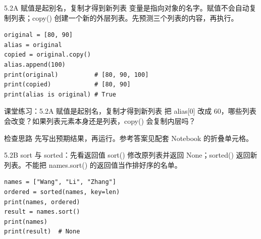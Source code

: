 \begin{frame}[fragile]{5.2A 赋值是起别名，复制才得到新列表}
\small 变量是指向对象的名字。赋值不会自动复制列表；copy() 创建一个新的外层列表。先预测三个列表的内容，再执行。
\medskip
\begin{lstlisting}
original = [80, 90]
alias = original
copied = original.copy()
alias.append(100)
print(original)          # [80, 90, 100]
print(copied)            # [80, 90]
print(alias is original) # True
\end{lstlisting}
\end{frame}
\begin{frame}[fragile]{课堂练习：5.2A 赋值是起别名，复制才得到新列表}
把 alias[0] 改成 60，哪些列表会改变？如果列表元素本身还是列表，copy() 会复制内层吗？
\medskip
\begin{block}{检查思路}
先写出预期结果，再运行。参考答案见配套 Notebook 的折叠单元格。
\end{block}
\end{frame}

\begin{frame}[fragile]{5.2B sort 与 sorted：先看返回值}
\small sort() 修改原列表并返回 None；sorted() 返回新列表。不能把 names.sort() 的返回值当作排好序的名单。
\medskip
\begin{lstlisting}
names = ["Wang", "Li", "Zhang"]
ordered = sorted(names, key=len)
print(names, ordered)
result = names.sort()
print(names)
print(result)  # None
\end{lstlisting}
\end{frame}
